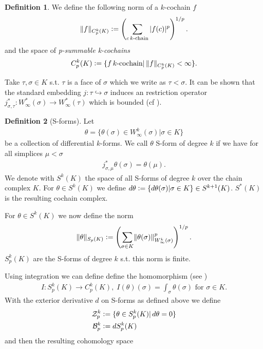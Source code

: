 \documentclass[12pt,a4paper]{article}
\theoremstyle{definition}
\newtheorem{definition}{Definition}
\newcommand{\norm}[1]{\lVert #1 \rVert}
\begin{document}
\begin{definition}
    We define the following norm of a $k$-cochain $f$
    \begin{align*}
    \norm{f}_{C_p^k(K)} \vcentcolon= 
    \left( \sum\limits_{c \, k\text{-chain}} |f(c)|^p \right)^{1/p}.
    \end{align*}
    and the space of \textit{p-summable k-cochains}
    \begin{align*}
    C_p^k(K) \vcentcolon= \{f \, k\text{-cochain} | \,  
    \norm{f}_{C_p^k(K)} < \infty \}.
    \end{align*}
\end{definition}
Take $\tau, \sigma \in K$ s.t. $\tau$ is a face of $\sigma$ which we write as
$\tau < \sigma$. It can be shown that the standard embedding 
$j: \tau \hookrightarrow \sigma$ induces an
restriction operator 
$j^*_{\sigma, \tau}:W^*_\infty(\sigma) \rightarrow W^*_\infty(\tau) $ which is 
bounded (cf \cite[p.191]{goldshtein}). 
\begin{definition}[S-forms]
    Let 
    \begin{align*}
    \theta = \{ \theta(\sigma) \in W^k_\infty(\sigma) | \sigma \in K\}
    \end{align*}
    be a collection of differential $k$-forms. We call $\theta$ S-form of degree
    $k$ if we have for all simplices
    $\mu <\sigma$ 
    \begin{align*}
    j^*_{\sigma,\mu}\theta(\sigma) = \theta(\mu).
    \end{align*}
    We denote with $S^k(K)$ the space of all S-forms of degree $k$ over the chain
    complex $K$. 
    For $\theta \in S^k(K)$ we define $d\theta \vcentcolon= \{ d\theta(\sigma) | 
    \sigma \in K \} \in S^{k+1}(K)$. $S^*(K)$ is the resulting cochain complex.
\end{definition}
For $\theta \in S^k(K)$ we now define the norm
\begin{align*}
\lVert \theta \rVert _{S_p(K)}  \vcentcolon= \left( \sum_{\sigma \in K} 
\lVert \theta(\sigma) \rVert _{W^k_\infty(\sigma)}^p \right)^{1/p}.
\end{align*} 
$S^k_p(K)$ are the S-forms of degree $k$ s.t. this norm is finite.

Using integration we can define define the homomorphism 
(see \cite[p.191]{goldshtein})
\begin{align*}
I: S_p^k(K) \rightarrow C_p^k(K), \; I(\theta)(\sigma) = 
\int_\sigma \theta(\sigma) \text{ for } \sigma \in K.
\end{align*}
With the exterior derivative $d$ on S-forms as defined above we define 
\begin{align*}
    \mathcal{Z}_p^k &\vcentcolon= \{ \theta \in S^k_p(K) | \, d\theta = 0 \} \\
    \mathcal{B}_p^k &\vcentcolon= dS^k_p(K)
\end{align*}
and then the resulting cohomology space
\end{document}
